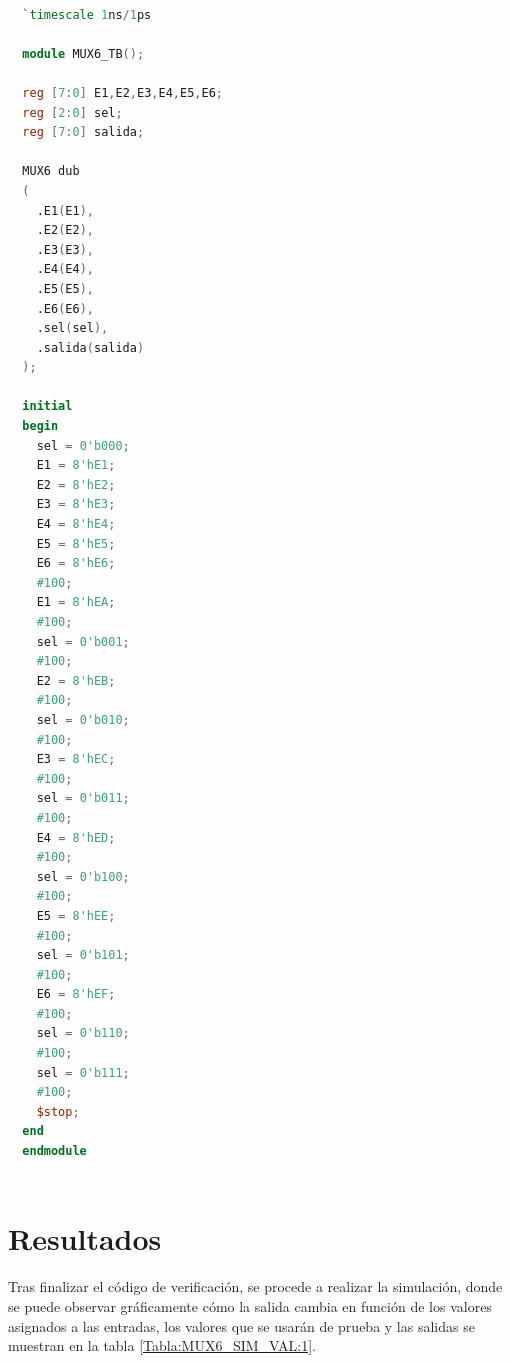 \documentclass[9pt,technote]{IEEEtran}
\begin{document}
	\begin{lstlisting}[language=Verilog, 
					   caption={Descripción del multiplexor 6:1 en SystemVerilog}, 
		              label={code:6to1mux}]
		              
  `timescale 1ns/1ps

  module MUX6_TB();

  reg [7:0] E1,E2,E3,E4,E5,E6;
  reg [2:0] sel;
  reg [7:0] salida;

  MUX6 dub
  (
	.E1(E1),
	.E2(E2),
	.E3(E3),
	.E4(E4),
	.E5(E5),
	.E6(E6),
	.sel(sel),
	.salida(salida)
  );

  initial
  begin
	sel = 0'b000;
	E1 = 8'hE1;
	E2 = 8'hE2;
	E3 = 8'hE3;
	E4 = 8'hE4;
	E5 = 8'hE5;
	E6 = 8'hE6;
	#100;
	E1 = 8'hEA;
	#100;
	sel = 0'b001;
	#100;
	E2 = 8'hEB;
	#100;
	sel = 0'b010;
	#100;
	E3 = 8'hEC;
	#100;
	sel = 0'b011;
	#100;
	E4 = 8'hED;
	#100;
	sel = 0'b100;
	#100;
	E5 = 8'hEE;
	#100;
	sel = 0'b101;
	#100;
	E6 = 8'hEF;
	#100;
	sel = 0'b110;
	#100;
	sel = 0'b111;
	#100;
	$stop;
  end
  endmodule
	
	\end{lstlisting}
	
	
	\section*{Resultados}
	Tras finalizar el código de verificación, se procede a realizar la simulación, donde se puede observar gráficamente cómo la salida cambia en función de los valores asignados a las entradas, los valores que se usarán de prueba y las salidas se muestran en la tabla \ref{Tabla:MUX6_SIM_VAL:1}.
	
\end{document}
